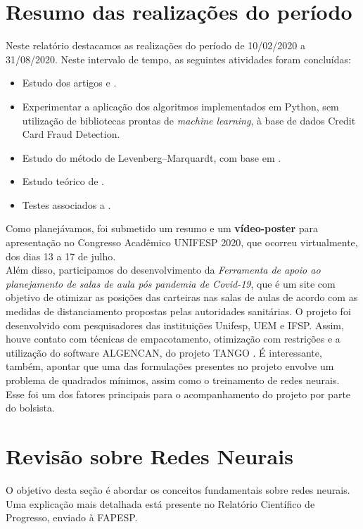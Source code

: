 \documentclass[11pt]{article}
\begin{document}
\section*{Resumo das realizações do período}
Neste relatório destacamos as realizações do período de 10/02/2020 a 31/08/2020. Neste intervalo de tempo, as seguintes atividades foram concluídas:

\begin{itemize}
\item Estudo dos artigos  \cite{fraudeItalia1} e  \cite{fraudeItalia2}.
\item Experimentar a aplicação dos algoritmos implementados em Python, sem utilização de bibliotecas prontas de \textit{machine learning}, à base de dados Credit Card Fraud Detection.

\item Estudo do método de Levenberg–Marquardt, com base em  \cite{TCCKleber}.
\item Estudo teórico de  \cite{bmLS}. 
\item Testes associados a  \cite{bmLS}.
\end{itemize}

\noindent
Como planejávamos, foi submetido um resumo e um \textbf{vídeo-poster} para apresentação no Congresso Acadêmico UNIFESP 2020, que ocorreu virtualmente, dos dias 13 a 17 de julho.\\

\noindent
Além disso, participamos do desenvolvimento da \textit{Ferramenta de apoio ao planejamento de salas de aula pós pandemia de Covid-19}, que é um site com objetivo de otimizar as posições das carteiras nas salas de aulas de acordo com as medidas de distanciamento propostas pelas autoridades sanitárias. O projeto foi desenvolvido com pesquisadores das instituições Unifesp, UEM e IFSP. Assim, houve contato com técnicas de empacotamento, otimização com restrições e a utilização do software ALGENCAN, do projeto TANGO \cite{TANGO}. É interessante, também, apontar que uma das formulações presentes no projeto envolve um problema de quadrados mínimos, assim como o treinamento de redes neurais. Esse foi um dos fatores principais para o acompanhamento do projeto por parte do bolsista.
\newpage

\section*{Revisão sobre Redes Neurais}
O objetivo desta seção é abordar os conceitos fundamentais sobre redes neurais. Uma explicação mais detalhada está presente no Relatório Científico de Progresso, enviado à FAPESP.
\end{document}
